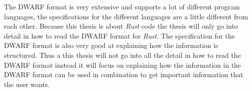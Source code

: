 The \gls{DWARF} format is very extensive and supports a lot of different program languages, the specifications for the different languages are a little different from each other.
Because this thesis is about \emph{Rust} code the thesis will only go into detail in how to read the \gls{DWARF} format for \emph{Rust}.
The specification for the \gls{DWARF} format is also very good at explaining how the information is structured.
Thus a this thesis will not go into all the detail in how to read the \gls{DWARF} format instead it will focus on explaining how the information in the \gls{DWARF} format can be used in combination to get important information that the user wants.


